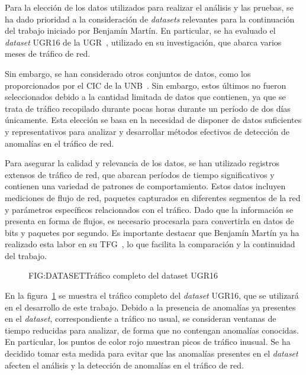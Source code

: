 Para la elección de los datos utilizados para realizar el análisis y las pruebas, se ha dado prioridad a la consideración de \textit{datasets} relevantes para la continuación del trabajo iniciado por Benjamín Martín. En particular, se ha evaluado el \textit{dataset} UGR16 de la  \ac{UGR}~\cite{datosugr16}, utilizado en su investigación, que abarca varios meses de tráfico de red. 

Sin embargo, se han considerado otros conjuntos de datos, como los proporcionados por el \ac{CIC} de la \ac{UNB}~\cite{datosunb19}. Sin embargo, estos últimos no fueron seleccionados debido a la cantidad limitada de datos que contienen, ya que se trata de tráfico recopilado durante pocas horas durante un período de dos días únicamente. Esta elección se basa en la necesidad de disponer de datos suficientes y representativos para analizar y desarrollar métodos efectivos de detección de anomalías en el tráfico de red.

Para asegurar la calidad y relevancia de los datos, se han utilizado registros extensos de tráfico de red, que abarcan períodos de tiempo significativos y contienen una variedad de patrones de comportamiento. Estos datos incluyen mediciones de flujo de red, paquetes capturados en diferentes segmentos de la red y parámetros específicos relacionados con el tráfico. Dado que la información se presenta en forma de flujos, es necesario procesarla para convertirla en datos de bits y paquetes por segundo.
Es importante destacar que Benjamín Martín ya ha realizado esta labor en su \ac{TFG}~\cite{benjamin2021}, lo que facilita la comparación y la continuidad del trabajo.

\begin{figure}[Tráfico completo del dataset UGR16~\cite{datosugr16}]{FIG:DATASET}{Tráfico completo del dataset UGR16~\cite{datosugr16}}
    \label{FIG:DATASET}
\end{figure}

En la figura~\ref{FIG:DATASET} se muestra el tráfico completo del \textit{dataset} UGR16, que se utilizará en el desarrollo de este trabajo. Debido a la presencia de anomalías ya presentes en el \textit{dataset}, correspondiente a tráfico no usual, se consideran ventanas de tiempo reducidas para analizar, de forma que no contengan anomalías conocidas. En particular, los puntos de color rojo muestran picos de tráfico inusual. Se ha decidido tomar esta medida para evitar que las anomalías presentes en el \textit{dataset} afecten el análisis y la detección de anomalías en el tráfico de red.

